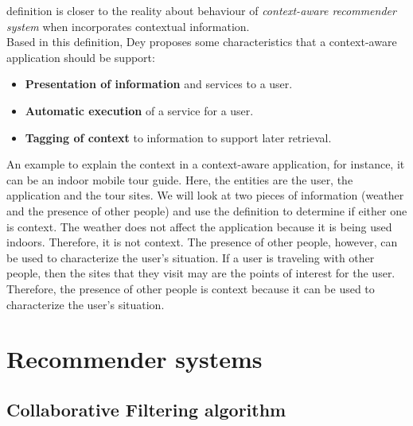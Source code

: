 definition is closer  to the reality about behaviour of \textit
{context-aware recommender system} when incorporates contextual
information.\\  
Based in this definition, Dey proposes some characteristics 
that a context-aware application should be support:
\begin{itemize}  
\item \textbf{Presentation of information} and services to a user.
\item \textbf{Automatic execution} of a service for a user.
\item \textbf{Tagging of context} to information to support later retrieval.
\end{itemize} 
An example to explain the context in a context-aware application, for
instance, it can be an indoor mobile tour guide. Here, the entities
are the user, the application and the tour sites. We will look at two
pieces of information (weather and the presence of other people) and
use the definition to determine if either one is context. The weather
does not affect the application because it is being used indoors.
Therefore, it is not context. The presence of other people, however,
can be used to characterize the user’s situation. If a user is
traveling with other people, then the sites that they visit may are
the points of interest for the user. Therefore, the presence of other
people is context because it can be used to characterize the user's
situation.

\section{Recommender systems}

\subsection{Collaborative Filtering algorithm}

